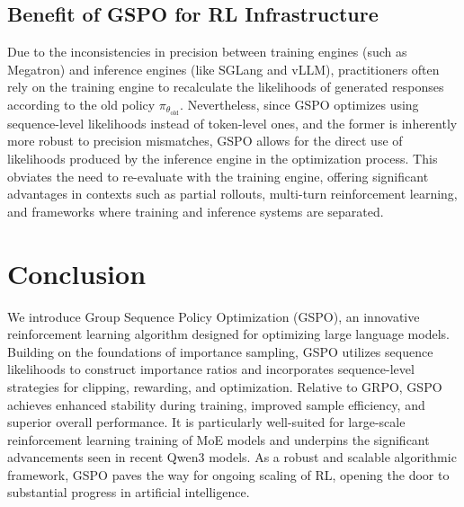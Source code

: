\subsection{Benefit of GSPO for RL Infrastructure}

Due to the inconsistencies in precision between training engines (such as Megatron) and inference engines (like SGLang and vLLM), practitioners often rely on the training engine to recalculate the likelihoods of generated responses according to the old policy $\pi_{\theta_\text{old}}$. Nevertheless, since GSPO optimizes using sequence-level likelihoods instead of token-level ones, and the former is inherently more robust to precision mismatches, GSPO allows for the direct use of likelihoods produced by the inference engine in the optimization process. This obviates the need to re-evaluate with the training engine, offering significant advantages in contexts such as partial rollouts, multi-turn reinforcement learning, and frameworks where training and inference systems are separated.

\section{Conclusion}

We introduce Group Sequence Policy Optimization (GSPO), an innovative reinforcement learning algorithm designed for optimizing large language models. Building on the foundations of importance sampling, GSPO utilizes sequence likelihoods to construct importance ratios and incorporates sequence-level strategies for clipping, rewarding, and optimization. Relative to GRPO, GSPO achieves enhanced stability during training, improved sample efficiency, and superior overall performance. It is particularly well-suited for large-scale reinforcement learning training of MoE models and underpins the significant advancements seen in recent Qwen3 models. As a robust and scalable algorithmic framework, GSPO paves the way for ongoing scaling of RL, opening the door to substantial progress in artificial intelligence.


